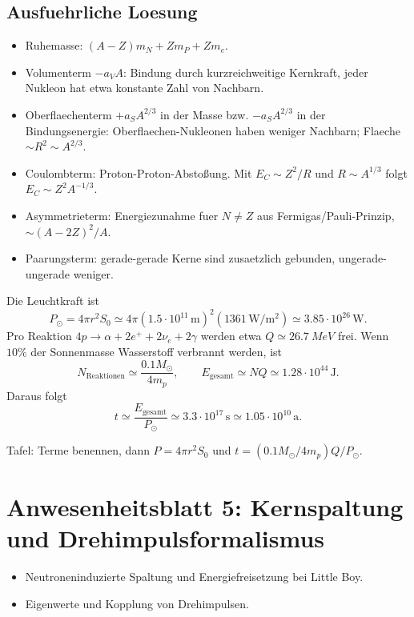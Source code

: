 \documentclass[11pt,a4paper]{scrartcl}
\begin{document}
\subsection{Ausfuehrliche Loesung}
\begin{calculationbox}[title={Terme der Massenformel}]
\begin{itemize}
\item Ruhemasse: \((A-Z)m_N+Zm_P+Zm_e\).
\item Volumenterm \(-a_VA\): Bindung durch kurzreichweitige Kernkraft, jeder Nukleon hat etwa konstante Zahl von Nachbarn.
\item Oberflaechenterm \(+a_SA^{2/3}\) in der Masse bzw. \(-a_SA^{2/3}\) in der Bindungsenergie: Oberflaechen-Nukleonen haben weniger Nachbarn; Flaeche \(\sim R^2\sim A^{2/3}\).
\item Coulombterm: Proton-Proton-Abstoßung. Mit \(E_C\sim Z^2/R\) und \(R\sim A^{1/3}\) folgt \(E_C\sim Z^2A^{-1/3}\).
\item Asymmetrieterm: Energiezunahme fuer \(N\neq Z\) aus Fermigas/Pauli-Prinzip, \(\sim(A-2Z)^2/A\).
\item Paarungsterm: gerade-gerade Kerne sind zusaetzlich gebunden, ungerade-ungerade weniger.
\end{itemize}
\end{calculationbox}
\begin{calculationbox}[title={Sonnenleistung und Brenndauer}]
Die Leuchtkraft ist
\[P_\odot=4\pi r^2S_0\simeq4\pi(1.5\cdot10^{11}\,\mathrm m)^2(1361\,\mathrm{W/m^2})\simeq3.85\cdot10^{26}\,\mathrm W.\]
Pro Reaktion \(4p\to\alpha+2e^++2\nu_e+2\gamma\) werden etwa \(Q\simeq\SI{26.7}{MeV}\) frei. Wenn \(10\%\) der Sonnenmasse Wasserstoff verbrannt werden, ist
\[N_{\mathrm{Reaktionen}}\simeq \frac{0.1M_\odot}{4m_p},\qquad E_{\mathrm{gesamt}}\simeq NQ\simeq1.28\cdot10^{44}\,\mathrm J.\]
Daraus folgt
\[t\simeq \frac{E_{\mathrm{gesamt}}}{P_\odot}\simeq3.3\cdot10^{17}\,\mathrm s\simeq1.05\cdot10^{10}\,\mathrm a.\]
\end{calculationbox}
\begin{talkbox}Tafel: Terme benennen, dann \(P=4\pi r^2S_0\) und \(t=(0.1M_\odot/4m_p)Q/P_\odot\).\end{talkbox}


\section{Anwesenheitsblatt 5: Kernspaltung und Drehimpulsformalismus}
\begin{taskbox}\begin{itemize}\item Neutroneninduzierte Spaltung und Energiefreisetzung bei Little Boy.\item Eigenwerte und Kopplung von Drehimpulsen.\end{itemize}\end{taskbox}
\end{document}
